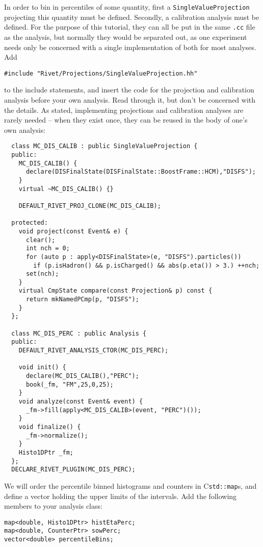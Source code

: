 \documentclass[11pt]{article}
\newcommand{\Cpp}{\hbox{C\raisebox{0.2ex}{\smaller \kern-.1em+\kern-.2em+}}\xspace}
\begin{document}
In order to bin in percentiles of some quantity, first a \texttt{SingleValueProjection} projecting this quantity must be defined. Secondly, a calibration analysis must be defined. For the purpose of this tutorial, they can all be put in the same \texttt{.cc} file as the analysis, but normally they would be separated out, as one experiment needs only be concerned with a single implementation of both for most analyses. Add
\begin{verbatim}
#include "Rivet/Projections/SingleValueProjection.hh"
\end{verbatim}
to the include statements, and insert the code for the projection and calibration analysis before your own analysis. Read through it, but don't be concerned with the details. As stated, implementing projections and calibration analyses are rarely needed -- when they exist once, they can be reused in the body of one's own analysis:
\begin{verbatim}
  class MC_DIS_CALIB : public SingleValueProjection {
  public:
    MC_DIS_CALIB() {
      declare(DISFinalState(DISFinalState::BoostFrame::HCM),"DISFS");
    }
    virtual ~MC_DIS_CALIB() {}

    DEFAULT_RIVET_PROJ_CLONE(MC_DIS_CALIB);
  
  protected:
    void project(const Event& e) {
      clear();
      int nch = 0;
      for (auto p : apply<DISFinalState>(e, "DISFS").particles())
        if (p.isHadron() && p.isCharged() && abs(p.eta()) > 3.) ++nch;
      set(nch);
    }
    virtual CmpState compare(const Projection& p) const {
      return mkNamedPCmp(p, "DISFS");
    }
  };

  class MC_DIS_PERC : public Analysis {
  public:
    DEFAULT_RIVET_ANALYSIS_CTOR(MC_DIS_PERC);

    void init() {
      declare(MC_DIS_CALIB(),"PERC");
      book(_fm, "FM",25,0,25);
    }
    void analyze(const Event& event) {
      _fm->fill(apply<MC_DIS_CALIB>(event, "PERC")());
    }
    void finalize() {
      _fm->normalize();
    }
    Histo1DPtr _fm;
  };
  DECLARE_RIVET_PLUGIN(MC_DIS_PERC);
\end{verbatim}

We will order the percentile binned histograms and counters in \Cpp \texttt{std::map}s, and define a vector holding the upper limits of the intervals. Add the following members to your analysis class:

\begin{verbatim}
map<double, Histo1DPtr> histEtaPerc;
map<double, CounterPtr> sowPerc;
vector<double> percentileBins;
\end{verbatim}
\end{document}
